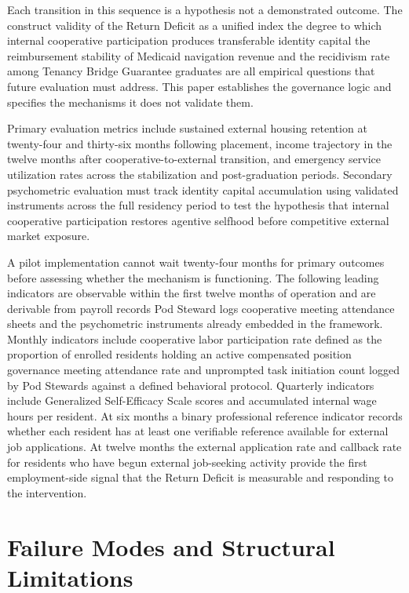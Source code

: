 \documentclass[12pt, letterpaper]{article}
\begin{document}
Each transition in this sequence is a hypothesis not a demonstrated outcome. The construct validity of the Return Deficit as a unified index the degree to which internal cooperative participation produces transferable identity capital the reimbursement stability of Medicaid navigation revenue and the recidivism rate among Tenancy Bridge Guarantee graduates are all empirical questions that future evaluation must address. This paper establishes the governance logic and specifies the mechanisms it does not validate them.

Primary evaluation metrics include sustained external housing retention at twenty-four and thirty-six months following placement, income trajectory in the twelve months after cooperative-to-external transition, and emergency service utilization rates across the stabilization and post-graduation periods. Secondary psychometric evaluation must track identity capital accumulation using validated instruments across the full residency period to test the hypothesis that internal cooperative participation restores agentive selfhood before competitive external market exposure.

A pilot implementation cannot wait twenty-four months for primary outcomes before assessing whether the mechanism is functioning. The following leading indicators are observable within the first twelve months of operation and are derivable from payroll records Pod Steward logs cooperative meeting attendance sheets and the psychometric instruments already embedded in the framework. Monthly indicators include cooperative labor participation rate defined as the proportion of enrolled residents holding an active compensated position governance meeting attendance rate and unprompted task initiation count logged by Pod Stewards against a defined behavioral protocol. Quarterly indicators include Generalized Self-Efficacy Scale scores and accumulated internal wage hours per resident. At six months a binary professional reference indicator records whether each resident has at least one verifiable reference available for external job applications. At twelve months the external application rate and callback rate for residents who have begun external job-seeking activity provide the first employment-side signal that the Return Deficit is measurable and responding to the intervention.

\section{Failure Modes and Structural Limitations}
\end{document}
